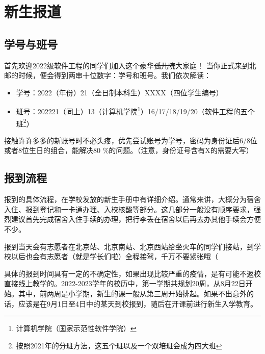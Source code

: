 \section{新生报道}

\subsection{学号与班号}

首先欢迎2022级软件工程的同学们加入这个豪华\sout{孤儿院}大家庭！
当你正式来到北邮的时候，便会得到两串十位数字：学号和班号。我们依次解读：
\begin{itemize}
    \itshape
    \item 学号：2022（年份）21（全日制本科生）XXXX（四位学生编号）
    \item 班号：202221（同上）13（计算机学院\footnote{计算机学院（国家示范性软件学院）}）16/17/18/19/20（软件工程的五个班\footnote{按照2021年的分班方法，这五个班以及一个双培班会成为四大班}）
\end{itemize}

接触许许多多的新账号时不必头疼，优先尝试账号为学号，密码为身份证后6/8位或者8位生日的组合，能解决80 \%的问题。（注意，身份证号含有X的需要大写）

\subsection{报到流程}

报到的具体流程，在学校发放的新生手册中有详细介绍。通常来讲，大概分为宿舍入住、报到登记和一卡通办理、入校核酸等部分。这几部分一般没有顺序要求，强烈建议首先完成宿舍入住手续的办理，把行李丢在宿舍以后再去办其他手续会方便不少。

报到当天会有志愿者在北京站、北京南站、北京西站给坐火车的同学们接站，到学校以后也会有志愿者（就是学长们啦）全程接驾，千万不要紧张哦（


具体的报到时间具有一定的不确定性，如果出现比较严重的疫情，是有可能不返校直接线上教学的。2022-2023学年的校历中，第一学期共规划20周，从8月22日开始。其中，前两周是小学期，新生的课一般从第三周开始排起。如果不出意外的话，应该是在9月1日至4日中的某天到校报到，随后在开课前进行新生入学教育。

